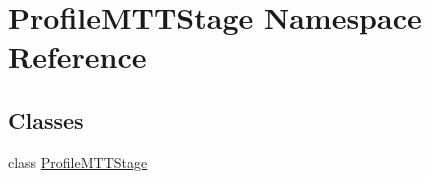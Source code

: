 \hypertarget{namespace_profile_m_t_t_stage}{\section{Profile\-M\-T\-T\-Stage Namespace Reference}
\label{namespace_profile_m_t_t_stage}
}
\subsection*{Classes}
\begin{DoxyCompactItemize}
\item 
class \hyperlink{class_profile_m_t_t_stage_1_1_profile_m_t_t_stage}{Profile\-M\-T\-T\-Stage}
\end{DoxyCompactItemize}
